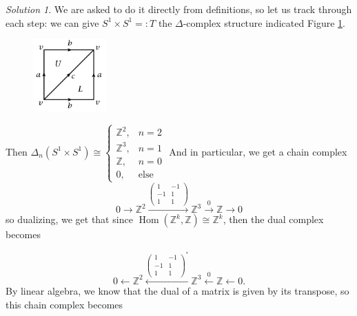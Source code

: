 \documentclass[reqno]{amsart}
\theoremstyle{definition}
\theoremstyle{remark}
\newtheorem*{solution}{Solution}
\DeclareMathOperator{\Hom}{Hom}
\begin{document}
     \begin{solution}
         We are asked to do it directly from definitions, so
         let us track through each step:
         we can give $S^{1} \times S^{1} =: T$ the
         $\Delta$-complex structure indicated Figure
         \ref{fig:Figures-Delta-for-T-png}.
         
         \begin{figure}[htpb]
             \centering
             \includegraphics[width=0.25\textwidth]{Figures/Delta-for-T.png}
             \caption{}
             \label{fig:Figures-Delta-for-T-png}
         \end{figure}

         Then
         $\Delta_n (S^{1} \times S^{1})
         \cong
         \begin{cases}
             \mathbb{Z}^2,& n=2\\
             \mathbb{Z}^3,& n=1\\
             \mathbb{Z},& n=0\\
             0,& \text{else}
         \end{cases}$ 
         And in particular, we get a chain complex
         \[
         0 \to \mathbb{Z}^2 
         \stackrel{
         \begin{pmatrix} 
             1 & -1\\
             -1 & 1\\
             1 & 1
     \end{pmatrix} }{\to}   \mathbb{Z}^3 
     \stackrel{0}{\to} \mathbb{Z} \to 0
         \] 
         so dualizing, we get
         that since  $\Hom(\mathbb{Z}^{k},\mathbb{Z})
         \cong \mathbb{Z}^{k}$, then the dual complex
         becomes

         \[
         0 \leftarrow \mathbb{Z}^2 
         \stackrel{
         \begin{pmatrix} 
             1 & -1\\
             -1 & 1\\
             1 & 1
     \end{pmatrix}^{*} }{\leftarrow}   \mathbb{Z}^3 
     \stackrel{0}{\leftarrow} \mathbb{Z} \leftarrow 0.
         \] 
         By linear algebra, we know that
         the dual of a matrix is given by its transpose, so
         this chain complex becomes


\end{solution}
\end{document}
